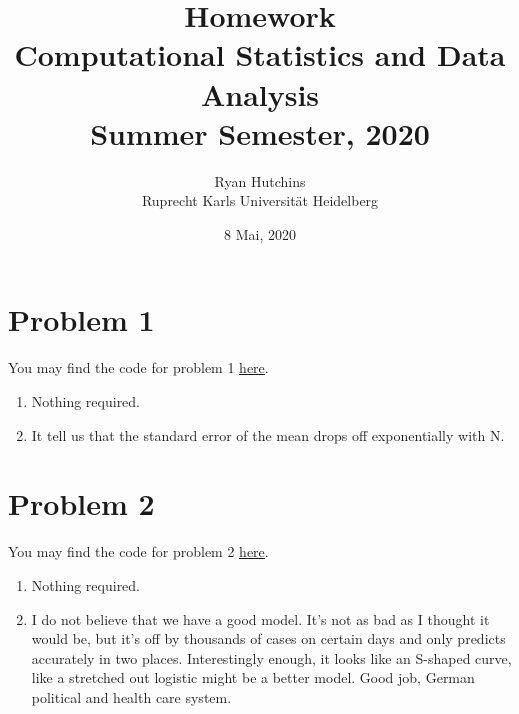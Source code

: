 \documentclass[a4paper,12pt]{article}
\title{
	Homework  \\
	\large Computational Statistics and Data Analysis \\
	\large Summer Semester, 2020
	}
\author{Ryan Hutchins \\ 
Ruprecht Karls Universit\"at Heidelberg}
\date{8 Mai, 2020}
\begin{document}
\maketitle
\section{Problem 1}
You may find the code for problem 1 \href{https://github.com/GoliathMarks/Computational_Statistics/blob/master/CompStatsHomeworkThree/CompStatsHomeworkThree.py}{here}.
\begin{enumerate}
\item Nothing required.
\item It tell us that the standard error of the mean drops off exponentially with N.
\end{enumerate}

\section{Problem 2}
You may find the code for problem 2 \href{https://github.com/GoliathMarks/Computational_Statistics/blob/master/CompStatsHomeworkThree/CompStatsHomeworkThree.py}{here}.
\begin{enumerate}
\item Nothing required.
\item I do not believe that we have a good model. It's not as bad as I thought it would be, but it's off by thousands of cases on certain days and only predicts accurately in two places. Interestingly enough, it looks like an S-shaped curve, like a stretched out logistic might be a better model. Good job, German political and health care system. 
\end{enumerate}
\end{document}
